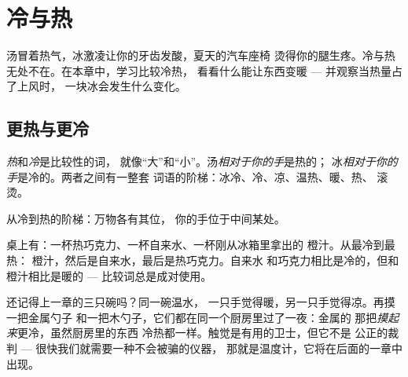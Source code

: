 \chapter{冷与热}\label{ch:g1:hot-and-cold}

汤冒着热气，冰激凌让你的牙齿发酸，夏天的汽车座椅
烫得你的腿生疼。冷与热无处不在。在本章中，学习比较冷热，
看看什么能让东西变暖 --- 并观察当热量占了上风时，
一块冰会发生什么变化。

\section{更热与更冷}

\begin{definition}[冷与热]\label{def:g1:hot-and-cold:words}
\emph{热}和\emph{冷}是比较性的词，
就像“大”和“小”。汤\emph{相对于你的手}是热的；
冰\emph{相对于你的手}是冷的。两者之间有一整套
词语的阶梯：冰冷、冷、凉、温热、暖、热、
滚烫。
\end{definition}

\begin{omfigure}

{\small 从冷到热的阶梯：万物各有其位，
你的手位于中间某处。}
\end{omfigure}

\begin{example}[给三杯饮料排序]\label{ex:g1:hot-and-cold:drinks}
桌上有：一杯热巧克力、一杯自来水、一杯刚从冰箱里拿出的
橙汁。从最冷到最热：
橙汁，然后是自来水，最后是热巧克力。自来水
和巧克力相比是冷的，但和橙汁相比是暖的 ---
比较词总是成对使用。
\end{example}

\begin{remark}[触觉会被骗]\label{rem:g1:hot-and-cold:fooled}
还记得上一章的三只碗吗？同一碗温水，
一只手觉得暖，另一只手觉得凉。再摸一把金属勺子
和一把木勺子，它们都在同一个厨房里过了一夜：金属的
那把\emph{摸起来}更冷，虽然厨房里的东西
冷热都一样。触觉是有用的卫士，但它不是
公正的裁判 --- 很快我们就需要一种不会被骗的仪器，
那就是温度计，它将在后面的一章中出现。
\end{remark}

